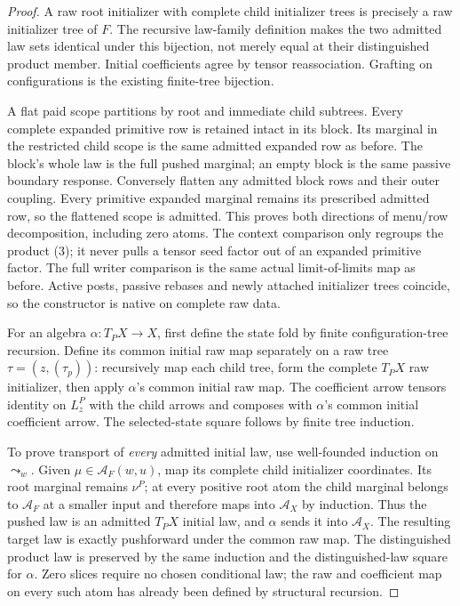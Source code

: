 \documentclass[11pt]{article}
\begin{document}
\begin{proof}
A raw root initializer with complete child initializer trees is precisely a raw initializer tree of $F$. The recursive law-family definition makes the two admitted law sets identical under this bijection, not merely equal at their distinguished product member. Initial coefficients agree by tensor reassociation. Grafting on configurations is the existing finite-tree bijection.

A flat paid scope partitions by root and immediate child subtrees. Every complete expanded primitive row is retained intact in its block. Its marginal in the restricted child scope is the same admitted expanded row as before. The block's whole law is the full pushed marginal; an empty block is the same passive boundary response. Conversely flatten any admitted block rows and their outer coupling. Every primitive expanded marginal remains its prescribed admitted row, so the flattened scope is admitted. This proves both directions of menu/row decomposition, including zero atoms. The context comparison only regroups the product (3); it never pulls a tensor seed factor out of an expanded primitive factor. The full writer comparison is the same actual limit-of-limits map as before. Active posts, passive rebases and newly attached initializer trees coincide, so the constructor is native on complete raw data.

For an algebra $\alpha:T_PX\to X$, first define the state fold by finite configuration-tree recursion. Define its common initial raw map separately on a raw tree $\tau=(z,(\tau_p))$: recursively map each child tree, form the complete $T_PX$ raw initializer, then apply $\alpha$'s common initial raw map. The coefficient arrow tensors identity on $L^P_z$ with the child arrows and composes with $\alpha$'s common initial coefficient arrow. The selected-state square follows by finite tree induction.

To prove transport of \emph{every} admitted initial law, use well-founded induction on $\leadsto_w$. Given $\mu\in\mathcal A_F(w,u)$, map its complete child initializer coordinates. Its root marginal remains $\nu^P$; at every positive root atom the child marginal belongs to $\mathcal A_F$ at a smaller input and therefore maps into $\mathcal A_X$ by induction. Thus the pushed law is an admitted $T_PX$ initial law, and $\alpha$ sends it into $\mathcal A_X$. The resulting target law is exactly pushforward under the common raw map. The distinguished product law is preserved by the same induction and the distinguished-law square for $\alpha$. Zero slices require no chosen conditional law; the raw and coefficient map on every such atom has already been defined by structural recursion.


\end{proof}
\end{document}
